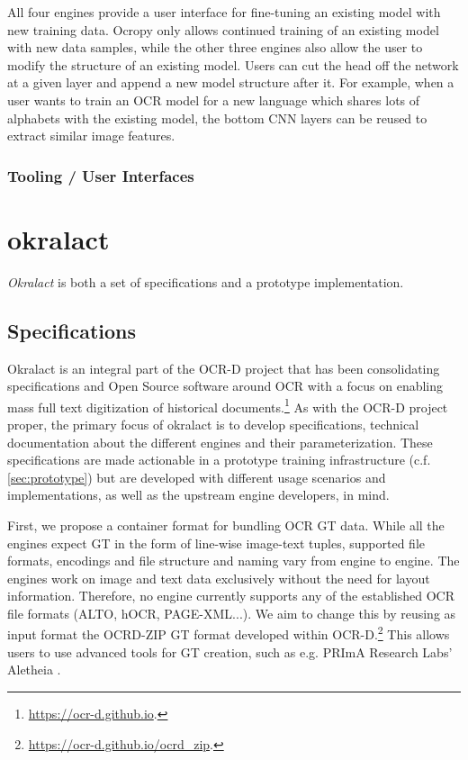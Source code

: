\documentclass[conference]{IEEEtran}
\begin{document}
All four engines provide a user interface for fine-tuning an
existing model with new training data. Ocropy only allows
continued training of an existing model with new data samples,
while the other three engines also allow the user to modify the
structure of an existing model. Users can cut the head off the
network at a given layer and append a new model structure after it.
For example, when a user wants to train an OCR model for a new
language which shares lots of alphabets with the existing model,
the bottom CNN layers can be reused to extract similar image
features.

\subsubsection*{Tooling / User Interfaces}


\section*{okralact}

\textit{Okralact} is both a set of specifications and a prototype
implementation.

\subsection*{Specifications}

Okralact is an integral part of the OCR-D project that has been
consolidating specifications and Open Source software around OCR
with a focus on enabling mass full text digitization of historical
documents.\footnote{\url{https://ocr-d.github.io}.} As with the
OCR-D project proper, the primary focus of okralact is to develop
specifications, technical documentation about the different engines
and their parameterization. These specifications are made
actionable in a prototype training infrastructure (c.f.
\ref{sec:prototype}) but are developed with different usage
scenarios and implementations, as well as the upstream engine
developers, in mind.

First, we propose a container format for bundling OCR GT data.
While all the engines expect GT in the form of line-wise image-text
tuples, supported file formats, encodings and file structure and
naming vary from engine to engine. The engines work on image and
text data exclusively without the need for layout information.
Therefore, no engine currently supports any of the established OCR
file formats (ALTO, hOCR, PAGE-XML...). We aim to change this by
reusing as input format the OCRD-ZIP GT format developed within
OCR-D.\footnote{\url{https://ocr-d.github.io/ocrd_zip}.} This
allows users to use advanced tools for GT creation, such as e.g. 
PRImA Research Labs' Aletheia \cite{clausner2011aletheia}.
\end{document}
